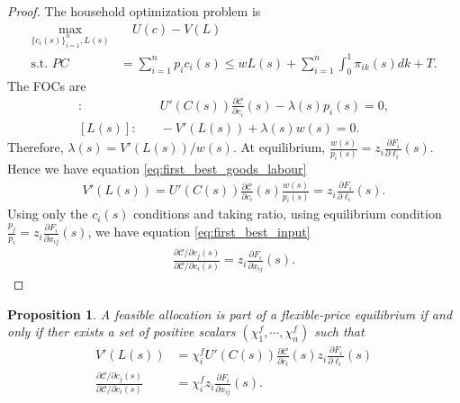 \documentclass[12pt]{article}
\newtheorem{proposition}{Proposition}
\numberwithin{equation}{section}
\begin{document}
\begin{proof}
    The household optimization problem is
    \begin{align*}
        \max_{\{c_i(s)\}_{i=1}^n, L(s)} &\quad U(c) - V(L) \\
        \text{s.t. } PC &= \sum_{i=1}^n p_i c_i(s) \leq wL(s) + \sum_{i=1}^n \int_0^1 \pi_{ik}(s) dk + T.
    \end{align*}
    The FOCs are
    \begin{align*}
        [c_i(s)]: &\quad U'(C(s))\frac{\partial \mathcal{C}}{\partial c_i}(s) - \lambda(s) p_i(s) = 0,\\
        [L(s)]: &\quad -V'(L(s)) + \lambda(s) w(s) = 0.
    \end{align*}
    Therefore, $\lambda(s) = V'(L(s))/w(s)$. At equilibrium, $\frac{w(s)}{p_i(s)} = z_i\frac{\partial F_i}{\partial \ell_i}(s)$. Hence we have equation \eqref{eq:first_best_goods_labour}
    \begin{align*}
        V'(L(s)) = U'(C(s))\frac{\partial \mathcal{C}}{\partial c_i}(s) \frac{w(s)}{p_i(s)} = z_i\frac{\partial F_i}{\partial \ell_i}(s).
    \end{align*}
    Using only the $c_i(s)$ conditions and taking ratio, using equilibrium condition $\frac{p_j}{p_i} = z_i\frac{\partial F_i}{\partial x_{ij}}(s)$, we have equation \eqref{eq:first_best_input}
    \begin{align*}
        \frac{\partial \mathcal{C} / \partial c_j(s)}{\partial \mathcal{C} / \partial c_i(s)} = z_i\frac{\partial F_i}{\partial x_{ij}}(s).
    \end{align*}
\end{proof}

\begin{proposition}
    A feasible allocation is part of a flexible-price equilibrium if and only if ther exists a set of positive scalars $(\chi_1^f, \cdots, \chi_n^f)$ such that
    \begin{align}
        V'(L(s)) &= \chi_i^f U'(C(s))\frac{\partial \mathcal{C}}{\partial c_i}(s) z_i\frac{\partial F_i}{\partial \ell_i}(s) \label{eq:flex_eqm_goods_labour} \\
        \frac{\partial \mathcal{C} / \partial c_j(s)}{\partial \mathcal{C} / \partial c_i(s)} &= \chi_i^f z_i\frac{\partial F_i}{\partial x_{ij}}(s). 
        \label{eq:flex_eqm_goods_subs}
    \end{align}
\end{proposition}
\end{document}
